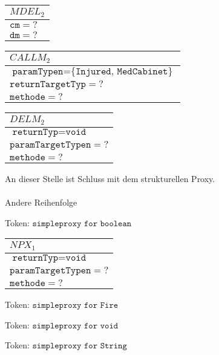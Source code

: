 \documentclass[a4paper,12pt]{article}
\begin{document}
\begin{table}[H]
\begin{tabular}{|l|}
\hline
\cellcolor{yellow}$\mathit{MDEL_2}$\\
\hline
$\texttt{cm} = ?$\\
$\texttt{dm} = ?$\\
\hline
\end{tabular}
\end{table}


\begin{table}[H]
\begin{tabular}{|l|}
\hline
\cellcolor{yellow}$\mathit{CALLM_2}$\\
\hline
$\texttt{paramTypen} = \text{\{}\texttt{Injured, MedCabinet}\text{\}}$\\
$\texttt{returnTargetTyp} = ?$\\
$\texttt{methode} = ?$\\
\hline
\end{tabular}
\end{table}


\begin{table}[H]
\begin{tabular}{|l|}
\hline
\cellcolor{yellow}$\mathit{DELM_2}$\\
\hline
$\texttt{returnTyp} = \texttt{void}$\\
$\texttt{paramTargetTypen} = ?$\\
$\texttt{methode} = ?$\\
\hline
\end{tabular}
\end{table}

An dieser Stelle ist Schluss mit dem strukturellen Proxy.
\\\\
Andere Reihenfolge

Token: $\texttt{simpleproxy for boolean}$

\begin{table}[H]
\begin{tabular}{|l|}
\hline
\cellcolor{yellow}$\mathit{NPX_1}$\\
\hline
$\texttt{returnTyp} = \texttt{void}$\\
$\texttt{paramTargetTypen} = ?$\\
$\texttt{methode} = ?$\\
\hline
\hline
\end{tabular}
\end{table}



Token: $\texttt{simpleproxy for Fire}$


Token: $\texttt{simpleproxy for void}$


Token: $\texttt{simpleproxy for String}$
\end{document}
